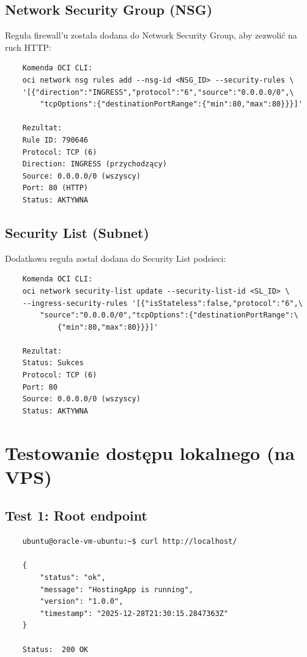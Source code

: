 \documentclass[twoside]{article}
\begin{document}
\subsection{Network Security Group (NSG)}

Reguła firewall'u została dodana do Network Security Group, aby zezwolić na ruch HTTP:

\begin{verbatim}
	Komenda OCI CLI:
	oci network nsg rules add --nsg-id <NSG_ID> --security-rules \
	'[{"direction":"INGRESS","protocol":"6","source":"0.0.0.0/0",\
		"tcpOptions":{"destinationPortRange":{"min":80,"max":80}}}]'
	
	Rezultat:
	Rule ID: 790646
	Protocol: TCP (6)
	Direction: INGRESS (przychodzący)
	Source: 0.0.0.0/0 (wszyscy)
	Port: 80 (HTTP)
	Status: AKTYWNA
\end{verbatim}

\subsection{Security List (Subnet)}

Dodatkowa reguła został dodana do Security List podsieci:

\begin{verbatim}
	Komenda OCI CLI:
	oci network security-list update --security-list-id <SL_ID> \
	--ingress-security-rules '[{"isStateless":false,"protocol":"6",\
		"source":"0.0.0.0/0","tcpOptions":{"destinationPortRange":\
			{"min":80,"max":80}}}]'
	
	Rezultat:
	Status: Sukces
	Protocol: TCP (6)
	Port: 80
	Source: 0.0.0.0/0 (wszyscy)
	Status: AKTYWNA
\end{verbatim}


\section{Testowanie dostępu lokalnego (na VPS)}

\subsection{Test 1: Root endpoint}

\begin{verbatim}
	ubuntu@oracle-vm-ubuntu:~$ curl http://localhost/
	
	{
		"status": "ok",
		"message": "HostingApp is running",
		"version": "1.0.0",
		"timestamp": "2025-12-28T21:30:15.2847363Z"
	}
	
	Status:  200 OK
\end{verbatim}
\end{document}
